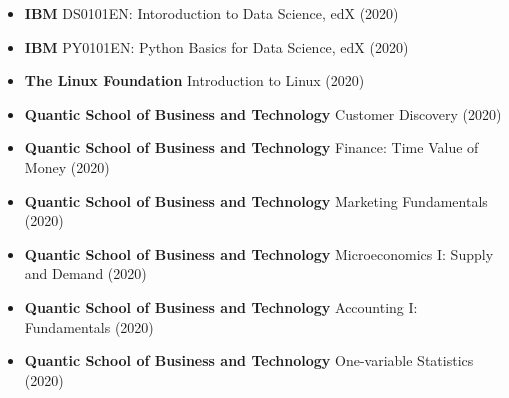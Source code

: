 \documentclass[11pt,letterpaper,sans]{moderncv} %
\begin{document}
\begin{itemize}
	\item \textbf{IBM} DS0101EN: Intoroduction to Data Science, edX (2020)
	\item \textbf{IBM} PY0101EN: Python Basics for Data Science, edX (2020)
	\item \textbf{The Linux Foundation} Introduction to Linux (2020)
	\item \textbf{Quantic School of Business and Technology} Customer Discovery (2020)
	\item \textbf{Quantic School of Business and Technology} Finance: Time Value of Money (2020)
        \item \textbf{Quantic School of Business and Technology} Marketing Fundamentals (2020)
	\item \textbf{Quantic School of Business and Technology} Microeconomics I: 
								   Supply and Demand (2020)
	\item \textbf{Quantic School of Business and Technology} Accounting I: Fundamentals (2020)
	\item \textbf{Quantic School of Business and Technology} One-variable Statistics (2020)
	

\end{itemize}






\end{document}
